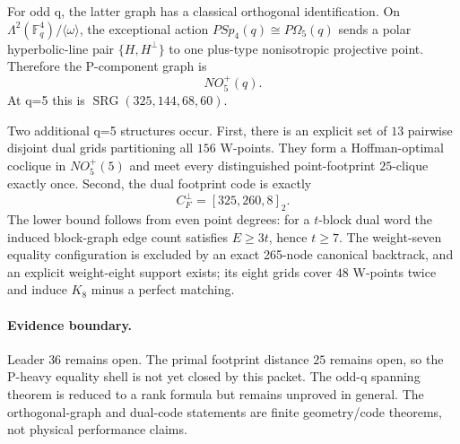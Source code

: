For odd q, the latter graph has a classical orthogonal identification.  On
$\Lambda^2(\mathbb F_q^4)/\langle\omega\rangle$, the exceptional action
$PSp_4(q)\cong P\Omega_5(q)$ sends a polar hyperbolic-line pair
$\{H,H^\perp\}$ to one plus-type nonisotropic projective point.  Therefore the
P-component graph is
\[
 \boxed{NO_5^+(q)}.
\]
At q=5 this is $\operatorname{SRG}(325,144,68,60)$.

Two additional q=5 structures occur.  First, there is an explicit set of $13$ pairwise disjoint dual grids partitioning all $156$ W-points.  They form a Hoffman-optimal coclique in $NO_5^+(5)$ and meet every distinguished point-footprint $25$-clique exactly once.  Second, the dual footprint code is exactly
\[
 \boxed{C_F^\perp=[325,260,8]_2}.
\]
The lower bound follows from even point degrees: for a $t$-block dual word the induced block-graph edge count satisfies $E\ge3t$, hence $t\ge7$.  The weight-seven equality configuration is excluded by an exact 265-node canonical backtrack, and an explicit weight-eight support exists; its eight grids cover $48$ W-points twice and induce $K_8$ minus a perfect matching.

\paragraph{Evidence boundary.}
Leader $36$ remains open.  The primal footprint distance $25$ remains open, so the P-heavy equality shell is not yet closed by this packet.  The odd-q spanning theorem is reduced to a rank formula but remains unproved in general.  The orthogonal-graph and dual-code statements are finite geometry/code theorems, not physical performance claims.
\fi
